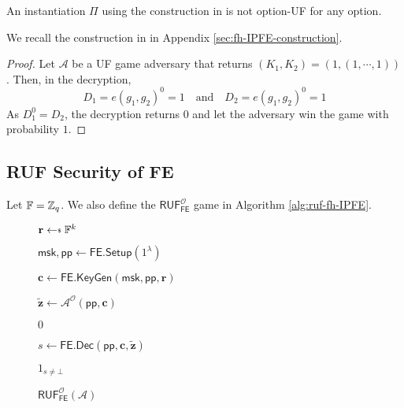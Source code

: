 \begin{theorem}

An instantiation $\Pi$ using the construction in \cite{cryptoeprint:2016/440} is not \textsf{option}-UF for any \textsf{option}.

\end{theorem}

\noindent We recall the construction in \cite{cryptoeprint:2016/440} in Appendix \ref{sec:fh-IPFE-construction}.

\begin{proof}

Let $\mathcal{A}$ be a \textsf{UF} game adversary that returns $(K_1, K_2) = (1, (1, \cdots, 1))$. Then, in the decryption,
\[
	D_1 = e(g_1, g_2)^{0} = 1 \quad \text{and} \quad D_2 = e(g_1, g_2)^0 = 1
\]
As $D_1^0 = D_2$, the decryption returns $0$ and let the adversary win the game with probability $1$.

\end{proof}


\subsection{RUF Security of \textsf{FE}}
\label{sec:security_analysis:fh-IPFE:ruf}

Let $\mathbb{F} = \mathbb{Z}_q$. We also define the $\textsf{RUF}^{\mathcal{O}}_\textsf{FE}$ game in Algorithm \ref{alg:ruf-fh-IPFE}.

\begin{figure}[H]
\centering

	\begin{minipage}[t]{0.55\textwidth}
	\begin{algorithm}[H]
	\caption{$\textsf{RUF}^{\mathcal{O}}_{\textsf{FE}}(\mathcal{A})$}
	\label{alg:ruf-fh-IPFE}
	\begin{algorithmic}[1]
		\State $\mathbf{r} \getsdollar \mathbb{F}^{k}$ \label{alg:oracle-ruf-fh-IPFE:r}

		\State $\textsf{msk}, \textsf{pp} \gets \textsf{FE.Setup}(1^\lambda)$

		\State $\mathbf{c} \gets \textsf{FE.KeyGen}(\textsf{msk}, \textsf{pp}, \mathbf{r})$

		\State $\mathbf{\tilde{z}} \gets \mathcal{A}^{\mathcal{O}} ( \textsf{pp}, \mathbf{c} )$

			
			\State \Return $0$
		
		\EndIf

		\State $s \gets \textsf{FE.Dec}(\textsf{pp}, \mathbf{c}, \mathbf{\tilde{z}} )$

		\State \Return $1_{s \neq \bot}$
	\end{algorithmic}
	\end{algorithm}
	\end{minipage}

\end{figure}


